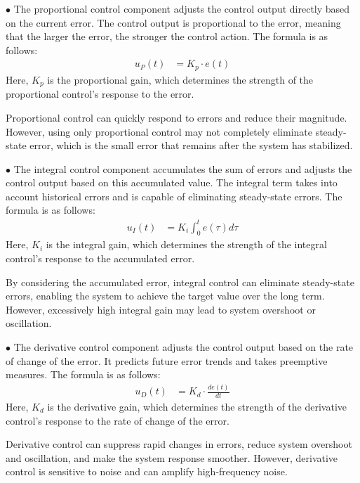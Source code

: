 \documentclass[lettersize,journal]{IEEEtran}
\begin{document}
$\bullet$ The proportional control component adjusts the control output directly based on the current error. 
The control output is proportional to the error, meaning that the larger the error, the stronger the control action. 
The formula is as follows:
\begin{align}
	u_{P}(t) & = K_{p} \cdot e(t)
\end{align}
Here, $K_{p}$ is the proportional gain, which determines the strength of the proportional control's response to the error.

Proportional control can quickly respond to errors and reduce their magnitude.
However, using only proportional control may not completely eliminate steady-state error, which is the small error that remains after the system has stabilized.

$\bullet$ The integral control component accumulates the sum of errors and adjusts the control output based on this accumulated value. 
The integral term takes into account historical errors and is capable of eliminating steady-state errors. 
The formula is as follows:
\begin{align}
	u_{I}(t) & = K_{i} \int_{0}^{t} e(\tau) d \tau
\end{align}
Here, $K_{i}$ is the integral gain, which determines the strength of the integral control's response to the accumulated error. 

By considering the accumulated error, integral control can eliminate steady-state errors, enabling the system to achieve the target value over the long term. 
However, excessively high integral gain may lead to system overshoot or oscillation.

$\bullet$ The derivative control component adjusts the control output based on the rate of change of the error. 
It predicts future error trends and takes preemptive measures. 
The formula is as follows:
\begin{align}
	u_{\mathit{D}}(t) & = K_{d} \cdot \frac{d e(t)}{d t}
\end{align}
Here, $K_{d}$ is the derivative gain, which determines the strength of the derivative control's response to the rate of change of the error.

Derivative control can suppress rapid changes in errors, reduce system overshoot and oscillation, and make the system response smoother. 
However, derivative control is sensitive to noise and can amplify high-frequency noise.
\end{document}
